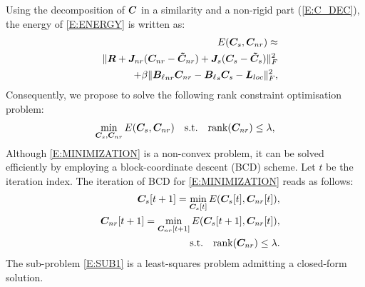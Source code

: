 Using the decomposition of $\boldsymbol{C}$ in a similarity and a
non-rigid part (\cref{E:C_DEC}), the energy of \cref{E:ENERGY} is written as:
\begin{eqnarray*}%
    &&E(\matr{C}_s,  \matr{C}_{nr} ) \approx \\
    &    &\norm{ \matr{R} + \matr{J}_{nr} (\matr{C}_{nr} - \matr{\tilde{C}}_{nr}) + \matr{J}_{s} (\matr{C}_{s} - \matr{\tilde{C}}_{s}) }_F^2 \nonumber \\
    &     &+ \beta \norm{{\matr{B}_\ell}_{nr} \matr{C}_{nr} - {\matr{B}_\ell}_{s} \matr{C}_{s} - \matr{L}_{loc}}_F^2,
\end{eqnarray*}
Consequently, we propose to solve the following rank constraint optimisation problem:
\begin{equation}\label{E:MINIMIZATION}
    \min_{\boldsymbol{C}_s,  \boldsymbol{C}_{nr}} E(\boldsymbol{C}_s,  \boldsymbol{C}_{nr} ) \quad \mbox{s.t.} \quad \mbox{rank}(\boldsymbol{C}_{nr}) \leq \lambda,
\end{equation}
Although \cref{E:MINIMIZATION} is a non-convex problem, it can be solved efficiently
by employing a block-coordinate descent (BCD) scheme. Let $t$ be the iteration index. The 
iteration of BCD for \cref{E:MINIMIZATION} reads as follows:
\begin{eqnarray}
    & &\boldsymbol{C}_s[t+1] =  \min_{\boldsymbol{C}_s[t]} E(\boldsymbol{C}_s[t],  \boldsymbol{C}_{nr}[t] ), \label{E:SUB1} \\ 
    & & \boldsymbol{C}_{nr}[t+1] =  \min_{\boldsymbol{C}_{nr}[t+1]} E(\boldsymbol{C}_s[t+1],  \boldsymbol{C}_{nr}[t] ), \nonumber \\
    & &\quad \mbox{s.t.} \quad \mbox{rank}(\boldsymbol{C}_{nr}) \leq \lambda. \label{E:SUB2}
\end{eqnarray}
The sub-problem \cref{E:SUB1} is a least-squares problem admitting a closed-form solution. 

